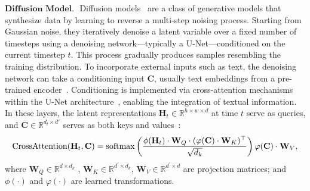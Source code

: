 $\textbf{Diffusion Model. }$ 
Diffusion models~\citep{rombach2022high, zhang2023adding} are a class of generative models that synthesize data by learning to reverse a multi-step noising process. Starting from Gaussian noise, they iteratively denoise a latent variable over a fixed number of timesteps using a denoising network—typically a U-Net—conditioned on the current timestep $t$. This process gradually produces samples resembling the training distribution.
To incorporate external inputs such as text, the denoising network can take a conditioning input $\mathbf{C}$, usually text embeddings from a pre-trained encoder~\citep{zhang2023adding}. Conditioning is implemented via cross-attention mechanisms within the U-Net architecture~\citep{williams2023unified}, enabling the integration of textual information. In these layers, the latent representations $\mathbf{H}_t \in \mathbb{R}^{h \times w \times d}$ at time $t$ serve as queries, and $\mathbf{C} \in \mathbb{R}^{d_t \times d'}$ serves as both keys and values~\citep{williams2023unified, yang2024mastering}: 
\begin{equation*}
\vspace{-0.1cm}
\text{CrossAttention}(\mathbf{H}_t, \mathbf{C}) = \text{softmax} \left( \frac{ \phi(\mathbf{H}_t) \cdot \mathbf{W}_Q \cdot (\varphi(\mathbf{C}) \cdot \mathbf{W}_{K})^\top}{\sqrt{d_k}} \right) \varphi(\mathbf{C}) \cdot \mathbf{W}_{V},
\end{equation*}
where $\mathbf{W}_Q\in \mathbb{R}^{d \times d_k} $ ,  $\mathbf{W}_K \in \mathbb{R}^{d^\prime \times d_k} $, $\mathbf{W}_V \in \mathbb{R}^{d^\prime \times d}$ are projection matrices; and $ \phi(\cdot)$ and $ \varphi(\cdot)$ are learned transformations.

